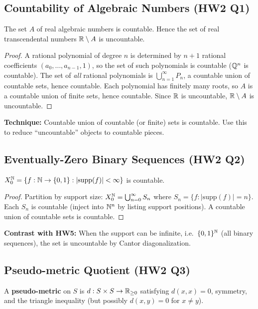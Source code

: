 \documentclass{article}
\begin{document}
\subsection{Countability of Algebraic Numbers (HW2 Q1)}
\begin{theorem}
  The set $A$ of real algebraic numbers is countable. Hence the set of
  real transcendental numbers $\mathbb{R} \setminus A$ is uncountable.
\end{theorem}
\begin{proof}
  A rational polynomial of degree $n$ is determined by $n+1$ rational
  coefficients $(a_0, \ldots, a_{n-1}, 1)$, so the set of such
  polynomials is countable ($\mathbb{Q}^n$ is countable).
  The set of \emph{all} rational polynomials is
  $\bigcup_{n=1}^\infty P_n$, a countable union of countable sets,
  hence countable.
  Each polynomial has finitely many roots, so $A$ is a countable union
  of finite sets, hence countable.
  Since $\mathbb{R}$ is uncountable, $\mathbb{R} \setminus A$ is uncountable.
\end{proof}
\textbf{Technique:} Countable union of countable (or finite) sets is
countable. Use this to reduce ``uncountable'' objects to countable
pieces.

\subsection{Eventually-Zero Binary Sequences (HW2 Q2)}
\begin{proposition}
  $X_0^{\mathbb{N}} = \{f : \mathbb{N} \to \{0,1\} : |\mathrm{supp}(f)| < \infty\}$
  is countable.
\end{proposition}
\begin{proof}
  Partition by support size: $X_0^{\mathbb{N}} = \bigcup_{n=0}^\infty S_n$ where
  $S_n = \{f : |\mathrm{supp}(f)| = n\}$.
  Each $S_n$ is countable (inject into $\mathbb{N}^n$ by listing support
  positions). A countable union of countable sets is countable.
\end{proof}
\textbf{Contrast with HW5:} When the support can be infinite, i.e.\
$\{0,1\}^{\mathbb{N}}$ (all binary sequences), the set is uncountable by Cantor
diagonalization.

\subsection{Pseudo-metric Quotient (HW2 Q3)}
\begin{definition}
  A \textbf{pseudo-metric} on $S$ is $d : S \times S \to \mathbb{R}_{\ge 0}$
  satisfying $d(x,x)=0$, symmetry, and the triangle inequality (but
  possibly $d(x,y)=0$ for $x \ne y$).
\end{definition}
\end{document}
